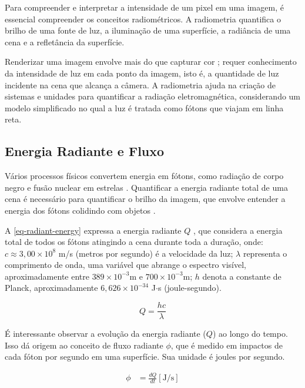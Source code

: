 \documentclass[english, 
               brazil, 
               bsc] %
               {dcomp-abntex2}
\begin{document}
Para compreender e interpretar a intensidade de um pixel em uma imagem, é essencial compreender os conceitos radiométricos. A radiometria quantifica o brilho de uma fonte de luz, a iluminação de uma superfície, a radiância de uma cena e a refletância da superfície.


Renderizar uma imagem envolve mais do que capturar cor \cite{radiometry_color}; requer conhecimento da intensidade de luz em cada ponto da imagem, isto é, a quantidade de luz incidente na cena que alcança a câmera. A radiometria ajuda na criação de sistemas e unidades para quantificar a radiação eletromagnética, considerando um modelo simplificado no qual a luz é tratada como fótons que viajam em linha reta. 


\subsection{Energia Radiante e Fluxo} \label{fluxo}


Vários processos físicos convertem energia em fótons, como radiação de corpo negro e fusão nuclear em estrelas \cite{black_body_radiation}. Quantificar a energia radiante total de uma cena é necessário para quantificar o brilho da imagem, que envolve entender a energia dos fótons colidindo com objetos \cite{rendering_judice}.


A \autoref{eq-radiant-energy} expressa a energia radiante \( Q \) \cite{pbr}, que considera a energia total de todos os fótons atingindo a cena durante toda a duração, onde:  \( c  \approx 3,00 \times 10^8 \) m/s (metros por segundo) é a velocidade da luz; \( \lambda \) representa o comprimento de onda, uma variável que abrange o espectro visível, aproximadamente entre \( 389 \times 10^{-3} \)m e \(700 \times 10^{-3} \)m; \( h \) denota a constante de Planck, aproximadamente \( 6,626 \times 10^{-34} \) J$\cdot$s (joule-segundo).




\begin{equation}\label{eq-radiant-energy}
Q = \frac{hc}{\lambda}
\end{equation}






É interessante observar a evolução da energia radiante ($Q$) ao longo do tempo. Isso dá origem ao conceito de fluxo radiante $\phi$, que é medido em impactos de cada fóton por segundo em uma superfície. Sua unidade é joules por segundo.


\begin{align*} 
  \phi &= \frac{dQ}{dt} [\text{J/s}] 
\end{align*}
\end{document}
